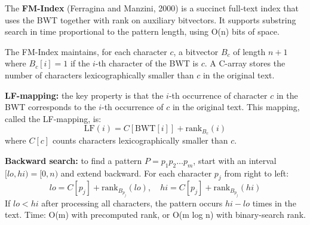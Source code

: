 The \textbf{FM-Index} (Ferragina and Manzini, 2000) is a succinct full-text index that uses the BWT together with rank on auxiliary bitvectors. It supports substring search in time proportional to the pattern length, using O(n) bits of space.

The FM-Index maintains, for each character $c$, a bitvector $B_c$ of length $n+1$ where $B_c[i] = 1$ if the $i$-th character of the BWT is $c$. A C-array stores the number of characters lexicographically smaller than $c$ in the original text.

\textbf{LF-mapping:} the key property is that the $i$-th occurrence of character $c$ in the BWT corresponds to the $i$-th occurrence of $c$ in the original text. This mapping, called the LF-mapping, is:
\[
\text{LF}(i) = C[\text{BWT}[i]] + \text{rank}_{B_c}(i)
\]
where $C[c]$ counts characters lexicographically smaller than $c$.

\textbf{Backward search:} to find a pattern $P = p_1 p_2 \ldots p_m$, start with an interval $[lo, hi) = [0, n)$ and extend backward. For each character $p_j$ from right to left:
\[
lo = C[p_j] + \text{rank}_{B_{p_j}}(lo), \quad
hi = C[p_j] + \text{rank}_{B_{p_j}}(hi)
\]
If $lo < hi$ after processing all characters, the pattern occurs $hi - lo$ times in the text. Time: O(m) with precomputed rank, or O(m log n) with binary-search rank.


